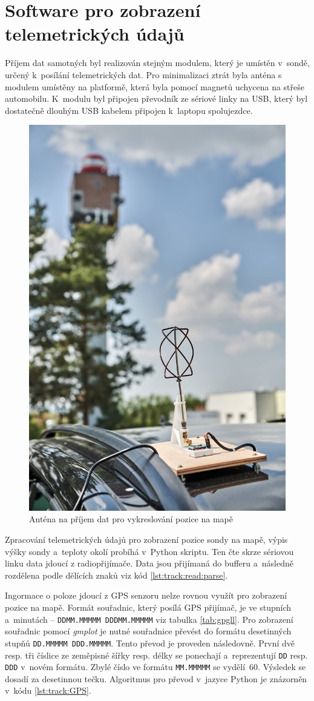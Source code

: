 \documentclass[twoside]{ctuthesis}
\theoremstyle{plain}
\theoremstyle{definition}
\theoremstyle{note}
\begin{document}
	\section{Software pro zobrazení telemetrických údajů}
	Příjem dat samotných byl realizován stejným modulem, který je umístěn v~sondě, určený k~posílání telemetrických dat. Pro minimalizaci ztrát byla anténa s modulem umístěny na platformě, která byla pomocí magnetů uchycena na střeše automobilu. K~modulu byl připojen převodník ze sériové linky na USB, který byl dostatečně dlouhým USB kabelem připojen k~laptopu spolujezdce.

	\begin{figure}
		\centering
		\includegraphics[width=.4\textwidth]{Figures/antena_auto.jpeg}
		\caption{Anténa na příjem dat pro vykreslování pozice na mapě}
		\label{fig:auto:antena}
	\end{figure}


	Zpracování telemetrických údajů pro zobrazení pozice sondy na mapě, výpis výšky sondy a~teploty okolí probíhá v~Python skriptu. Ten čte skrze sériovou linku data jdoucí z radiopřijímače. Data jsou přijímaná do bufferu a~následně rozdělena podle dělících znaků viz kód \ref{lst:track:read:parse}.
	

	Ingormace o poloze jdoucí z GPS senzoru nelze rovnou využít pro zobrazení pozice na mapě. Formát souřadnic, který posílá GPS přijímač, je ve stupních a~minutách -- \lstinline|DDMM.MMMMM DDDMM.MMMMM| viz tabulka \ref{tab:gpgll}. Pro zobrazení souřadnic pomocí \textit{gmplot} je nutné souřadnice převést do formátu desetinných stupňů \lstinline|DD.MMMMM DDD.MMMMM|. Tento převod je proveden následovně. První dvě resp. tři číslice ze zeměpisné šířky resp. délky se ponechají a~reprezentují \lstinline|DD| resp. \lstinline|DDD| v~novém formátu. Zbylé číslo ve formátu \lstinline|MM.MMMMM| se vydělí~60. Výsledek se dosadí za desetinnou tečku. Algoritmus pro převod v~jazyce Python je znázorněn v~kódu \ref{lst:track:GPS}.
\end{document}
